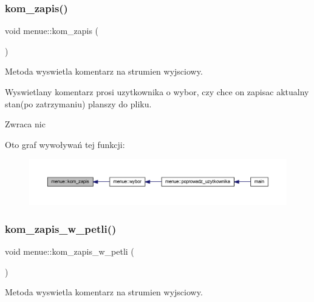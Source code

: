 \subsubsection{\texorpdfstring{kom\+\_\+zapis()}{kom\_zapis()}}
{\footnotesize\ttfamily void menue\+::kom\+\_\+zapis (\begin{DoxyParamCaption}{ }\end{DoxyParamCaption})\hspace{0.3cm}{\ttfamily [static]}}

Metoda wyswietla komentarz na strumien wyjsciowy.

Wyswietlany komentarz prosi uzytkownika o wybor, czy chce on zapisac aktualny stan(po zatrzymaniu) planszy do pliku. \begin{DoxyReturn}{Zwraca}
nic 
\end{DoxyReturn}
Oto graf wywoływań tej funkcji\+:
\nopagebreak
\begin{figure}[H]
\begin{center}
\leavevmode
\includegraphics[width=350pt]{classmenue_a96748d0634771d7150c1eb73ed7472c5_icgraph}
\end{center}
\end{figure}
\mbox{\label{classmenue_a303502c5a160ee276a3ac7ce21ef4f4f}} 
\subsubsection{\texorpdfstring{kom\+\_\+zapis\+\_\+w\+\_\+petli()}{kom\_zapis\_w\_petli()}}
{\footnotesize\ttfamily void menue\+::kom\+\_\+zapis\+\_\+w\+\_\+petli (\begin{DoxyParamCaption}{ }\end{DoxyParamCaption})\hspace{0.3cm}{\ttfamily [static]}}

Metoda wyswietla komentarz na strumien wyjsciowy.

